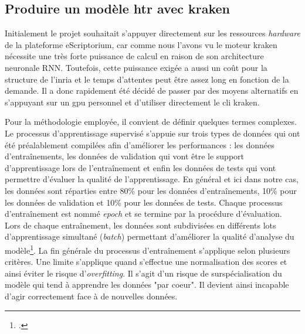 	\subsection{Produire un modèle \gls{htr} avec \gls{kraken}}
	
	Initialement le projet souhaitait s'appuyer directement sur les ressources \textit{hardware} de la plateforme \gls{eScriptorium}, car comme nous l'avons vu le moteur \gls{kraken} nécessite une très forte puissance de calcul en raison de son architecture neuronale \gls{RNN}. Toutefois, cette puissance exigée a aussi un coût pour la structure de l'\gls{inria} et le temps d'attentes peut être assez long en fonction de la demande. Il a donc rapidement été décidé de passer par des moyens alternatifs en s'appuyant sur un \gls{gpu} personnel et d'utiliser directement le \gls{cli} \gls{kraken}.
	
	Pour la méthodologie employée, il convient de définir quelques termes complexes. Le processus d'apprentissage supervisé s'appuie sur trois types de données qui ont été préalablement compilées afin d'améliorer les performances : les données d'entraînements, les données de validation qui vont être le support d'apprentissage lors de l'entraînement et enfin les données de tests qui vont permettre d'évaluer la qualité de l'apprentissage. En général et ici dans notre cas, les données sont réparties entre 80\% pour les données d'entraînements, 10\% pour les données de validation et 10\% pour les données de tests. Chaque processus d'entraînement est nommé \textit{epoch} et se termine par la procédure d'évaluation. Lors de chaque entraînement, les données sont subdivisées en différents lots d'apprentissage simultané (\textit{batch}) permettant d'améliorer la qualité d'analyse du modèle\footcite[Pour plus de détails, la documentation de Kraken est particulièrement explicite dans le fonctionnement de l'apprentissage \textit{in}]{kiesslingKrakenOCRSystem2022}. La fin générale du processus d'entraînement s'applique selon plusieurs critères. Une limite s'applique quand s'effectue une normalisation des scores et ainsi éviter le risque d'\textit{overfitting}. Il s'agit d'un risque de surspécialisation du modèle qui tend à apprendre les données "par coeur". Il devient ainsi incapable d'agir correctement face à de nouvelles données.
	
